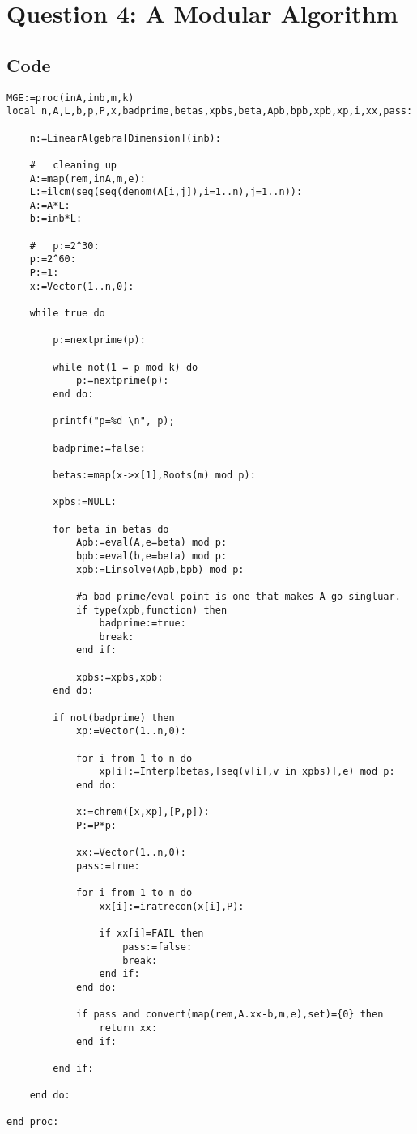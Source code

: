 \documentclass[10pt]{report}
\begin{document}
\newpage
\section*{Question 4: A Modular Algorithm}

\subsection*{Code}
\begin{verbatim}
MGE:=proc(inA,inb,m,k)
local n,A,L,b,p,P,x,badprime,betas,xpbs,beta,Apb,bpb,xpb,xp,i,xx,pass:
    
    n:=LinearAlgebra[Dimension](inb):
    
    #	cleaning up
    A:=map(rem,inA,m,e):
    L:=ilcm(seq(seq(denom(A[i,j]),i=1..n),j=1..n)):
    A:=A*L:
    b:=inb*L:
    
    #	p:=2^30:
    p:=2^60:
    P:=1:	
    x:=Vector(1..n,0):
    
    while true do
    
        p:=nextprime(p):
        
        while not(1 = p mod k) do
            p:=nextprime(p):
        end do:			
        
        printf("p=%d \n", p);
        
        badprime:=false:
        
        betas:=map(x->x[1],Roots(m) mod p):
        
        xpbs:=NULL:	
        
        for beta in betas do
            Apb:=eval(A,e=beta) mod p:
            bpb:=eval(b,e=beta) mod p:
            xpb:=Linsolve(Apb,bpb) mod p:
            
            #a bad prime/eval point is one that makes A go singluar.
            if type(xpb,function) then
                badprime:=true:
                break:
            end if:
            
            xpbs:=xpbs,xpb:
        end do:
        
        if not(badprime) then
            xp:=Vector(1..n,0):
        
            for i from 1 to n do
                xp[i]:=Interp(betas,[seq(v[i],v in xpbs)],e) mod p: 
            end do:
            
            x:=chrem([x,xp],[P,p]):
            P:=P*p:
            
            xx:=Vector(1..n,0):
            pass:=true:
            
            for i from 1 to n do
                xx[i]:=iratrecon(x[i],P):
                
                if xx[i]=FAIL then
                    pass:=false:
                    break:
                end if:
            end do:
            
            if pass and convert(map(rem,A.xx-b,m,e),set)={0} then
                return xx:
            end if:
            
        end if:
        
    end do:
    
end proc:

\end{verbatim}
\end{document}
